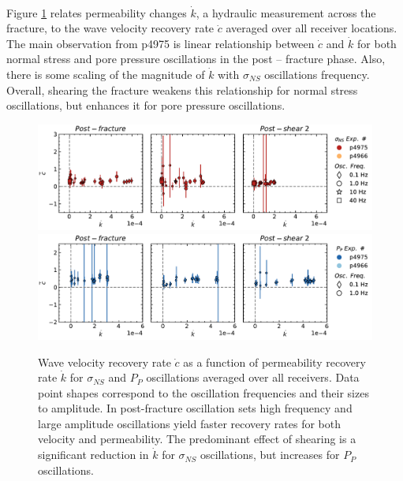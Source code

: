 \documentclass[letterpaper,10pt]{article}
\begin{document}
\clearpage

\paragraph{}
Figure \ref{fig:avg_recov_plots} relates permeability changes $ \dot k $, a hydraulic measurement across the fracture, to the wave velocity recovery rate $ \dot c $ averaged over all receiver locations. The main observation from p4975 is linear relationship between $ \dot c $ and $ \dot k $ for both normal stress and pore pressure oscillations in the post -- fracture phase. Also, there is some scaling of the magnitude of $ \dot k$  with  $ \sigma_{NS}$ oscillations frequency.  Overall, shearing the fracture weakens this relationship for normal stress oscillations, but enhances it for pore pressure oscillations.

\clearpage

\begin{figure}[ht]
	\centering
	\includegraphics[width=1\columnwidth]{avg_recov_All_ampsNS}
	\includegraphics[width=1\columnwidth]{avg_recov_All_ampsPP}
	\caption{Wave velocity recovery rate $ \dot c $ as a function of permeability recovery rate $ \dot k$ for $ \sigma_{NS} $ and $ P_P $ oscillations averaged over all receivers. Data point shapes correspond to the oscillation frequencies and their sizes to amplitude. In post-fracture oscillation sets high frequency and large amplitude oscillations yield faster recovery rates for both velocity and permeability. The predominant effect of shearing is a significant reduction in $ \dot k $ for $ \sigma_{NS} $ oscillations, but increases for  $ P_P $ oscillations.}
	\label{fig:avg_recov_plots}
\end{figure}
\end{document}
